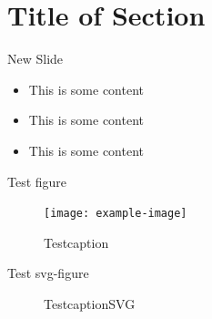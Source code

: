 \documentclass[
]{beamer}
\begin{document}
\section{Title of Section}

\begin{frame}{New Slide}

\begin{itemize}
\item This is some content
\item This is some content
\item This is some content
\end{itemize}

\end{frame}

\begin{frame}{Test figure}

\begin{figure}
    \texttt{[image: example-image]}
    \caption{Testcaption}\label{fig:testfig}
\end{figure}
\end{frame}

\begin{frame}{Test svg-figure}

\begin{figure}
    \def\svgwidth{.6\textwidth}
    \scriptsize{}
	\caption{TestcaptionSVG}\label{fig:svg}
\end{figure}

\end{frame}
\end{document}
